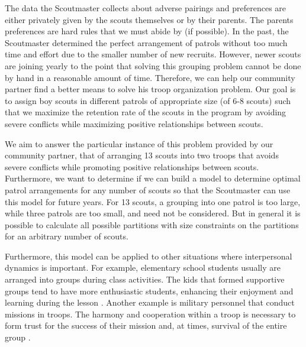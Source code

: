 \documentclass{amsart}
\theoremstyle{definition}
\theoremstyle{remark}
\numberwithin{equation}{section}
\begin{document}
The data the Scoutmaster collects about adverse pairings and preferences are either privately given by the scouts themselves or by their parents. The parents preferences are hard rules that we must abide by (if possible). In the past, the Scoutmaster determined the perfect arrangement of patrols without too much time and effort due to the smaller number of new recruits. However, newer scouts are joining yearly to the point that solving this grouping problem cannot be done by hand in a reasonable amount of time. Therefore, we can help our community partner find a better means to solve his troop organization problem. Our goal is to assign boy scouts in different patrols of appropriate size (of 6-8 scouts) such that we maximize the retention rate of the scouts in the program by avoiding severe conflicts while maximizing positive relationships between scouts.

We aim to answer the particular instance of this problem provided by our community partner, that of arranging 13 scouts into two troops that avoids severe conflicts while promoting positive relationships between scouts. Furthermore, we want to determine if we can build a model to determine optimal patrol arrangements for any number of scouts so that the Scoutmaster can use this model for future years. For 13 scouts, a grouping into one patrol is too large, while three patrols are too small, and need not be considered. But in general it is possible to calculate all possible partitions with size constraints on the partitions for an arbitrary number of scouts\cite{B}. 

Furthermore, this model can be applied to other situations where interpersonal dynamics is important. For example, elementary school students usually are arranged into groups during class activities. The kids that formed supportive groups tend to have more enthusiastic students, enhancing their enjoyment and learning during the lesson \cite{D}. Another example is military personnel that conduct missions in troops. The harmony and cooperation within a troop is necessary to form trust for the success of their mission and, at times, survival of the entire group \cite{E}. 
\end{document}
